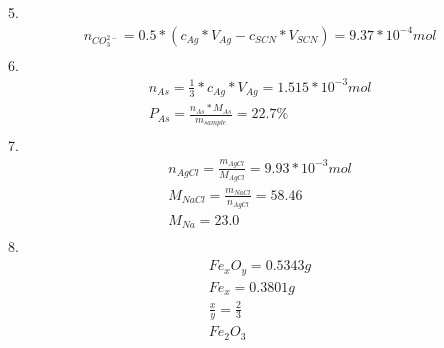 \documentclass{article}
\begin{document}
5.\begin{equation}
    \begin{multlined}
        n_{CO_3^{2-}} = 0.5*(c_{Ag}*V_{Ag} - c_{SCN}*V_{SCN}) = 9.37*10^{-4} mol\\
    \end{multlined}
\end{equation}
6.\begin{equation}
    \begin{multlined}
        n_{As} = \frac{1}{3}* c_{Ag}*V_{Ag} = 1.515*10^{-3} mol\\
        P_{As} = \frac{n_{As}*M_{As}}{m_{sample}} = 22.7\%\\
    \end{multlined}
\end{equation}
7.\begin{equation}
    \begin{multlined}
        n_{AgCl} = \frac{m_{AgCl}}{M_{AgCl}} = 9.93*10^{-3} mol\\
        M_{NaCl} = \frac{m_{NaCl}}{n_{AgCl}} = 58.46\\
        M_{Na} = 23.0\\
    \end{multlined}
\end{equation}
8.\begin{equation}
    \begin{multlined}
    Fe_xO_y = 0.5343 g\\
    Fe_x = 0.3801 g\\
    \frac{x}{y} = \frac{2}{3}\\
    Fe_2O_3\\
    \end{multlined}
\end{equation}
\end{document}
